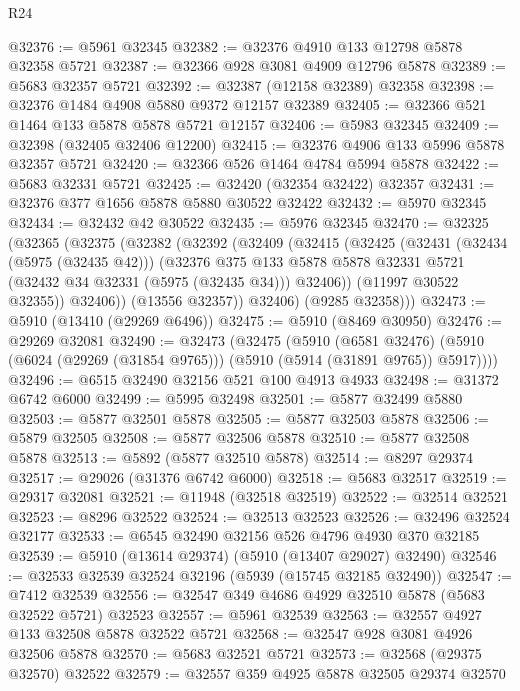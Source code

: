 \begin{lexlean}{R24}
\begin{coremodule}
@32376 := @5961 @32345
@32382 := @32376 @4910 @133 @12798 @5878 @32358 @5721
@32387 := @32366 @928 @3081 @4909 @12796 @5878
@32389 := @5683 @32357 @5721
@32392 := @32387 (@12158 @32389) @32358
@32398 := @32376 @1484 @4908 @5880 @9372 @12157 @32389
@32405 := @32366 @521 @1464 @133 @5878 @5878 @5721 @12157
@32406 := @5983 @32345
@32409 := @32398 (@32405 @32406 @12200)
@32415 := @32376 @4906 @133 @5996 @5878 @32357 @5721
@32420 := @32366 @526 @1464 @4784 @5994 @5878
@32422 := @5683 @32331 @5721
@32425 := @32420 (@32354 @32422) @32357
@32431 := @32376 @377 @1656 @5878 @5880 @30522 @32422
@32432 := @5970 @32345
@32434 := @32432 @42 @30522
@32435 := @5976 @32345
@32470 := @32325
    (@32365
      (@32375
        (@32382
          (@32392
            (@32409
              (@32415
                (@32425
                  (@32431
                    (@32434 (@5975 (@32435 @42)))
                    (@32376
                      @375
                      @133
                      @5878
                      @5878
                      @32331
                      @5721
                      (@32432 @34 @32331 (@5975 (@32435 @34)))
                      @32406))
                  (@11997 @30522 @32355))
                @32406))
            (@13556 @32357))
          @32406)
        (@9285 @32358)))
@32473 := @5910 (@13410 (@29269 @6496))
@32475 := @5910 (@8469 @30950)
@32476 := @29269 @32081
@32490 := @32473
    (@32475
      (@5910
        (@6581 @32476)
        (@5910 (@6024 (@29269 (@31854 @9765))) (@5910 (@5914 (@31891 @9765)) @5917))))
@32496 := @6515 @32490 @32156 @521 @100 @4913 @4933
@32498 := @31372 @6742 @6000
@32499 := @5995 @32498
@32501 := @5877 @32499 @5880
@32503 := @5877 @32501 @5878
@32505 := @5877 @32503 @5878
@32506 := @5879 @32505
@32508 := @5877 @32506 @5878
@32510 := @5877 @32508 @5878
@32513 := @5892 (@5877 @32510 @5878)
@32514 := @8297 @29374
@32517 := @29026 (@31376 @6742 @6000)
@32518 := @5683 @32517
@32519 := @29317 @32081
@32521 := @11948 (@32518 @32519)
@32522 := @32514 @32521
@32523 := @8296 @32522
@32524 := @32513 @32523
@32526 := @32496 @32524 @32177
@32533 := @6545 @32490 @32156 @526 @4796 @4930 @370 @32185
@32539 := @5910 (@13614 @29374) (@5910 (@13407 @29027) @32490)
@32546 := @32533 @32539 @32524 @32196 (@5939 (@15745 @32185 @32490))
@32547 := @7412 @32539
@32556 := @32547 @349 @4686 @4929 @32510 @5878 (@5683 @32522 @5721) @32523
@32557 := @5961 @32539
@32563 := @32557 @4927 @133 @32508 @5878 @32522 @5721
@32568 := @32547 @928 @3081 @4926 @32506 @5878
@32570 := @5683 @32521 @5721
@32573 := @32568 (@29375 @32570) @32522
@32579 := @32557 @359 @4925 @5878 @32505 @29374 @32570

\end{coremodule}
\end{lexlean}
